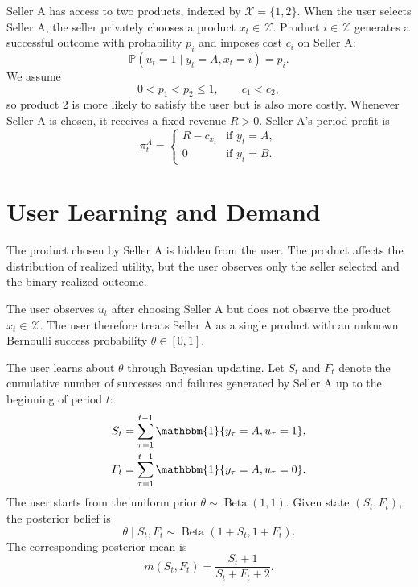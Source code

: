 \documentclass[opre]{informs3}
\newcommand{\Pb}{\mathbb{P}}
\newcommand{\Ind}[1]{\mathbbm{1}\{#1\}}
\newcommand{\Xscr}{\mathcal{X}}
\begin{document}
Seller A has access to two products, indexed by $\Xscr=\{1,2\}$. When the user
selects Seller A, the seller privately chooses a product $x_t\in\Xscr$. Product
$i\in\Xscr$ generates a successful outcome with probability $p_i$ and imposes
cost $c_i$ on Seller A:
\begin{equation}
    \Pb(u_t=1\mid y_t=A,x_t=i)=p_i.
    \label{eq:seller-a-success}
\end{equation}
We assume
\begin{equation}
    0<p_1<p_2\leq 1,\qquad c_1<c_2,
    \label{eq:product-ordering}
\end{equation}
so product 2 is more likely to satisfy the user but is also more costly. Whenever
Seller A is chosen, it receives a fixed revenue $R>0$. Seller A's period profit
is
\begin{equation}
    \pi_t^A=
    \begin{cases}
        R-c_{x_t} & \text{if } y_t=A,\\
        0 & \text{if } y_t=B.
    \end{cases}
    \label{eq:period-profit}
\end{equation}

\section{User Learning and Demand}

The product chosen by Seller A is hidden from the user. The product affects the
distribution of realized utility, but the user observes only the seller selected
and the binary realized outcome.

\begin{assumption}
The user observes $u_t$ after choosing Seller A but does not observe the product
$x_t\in\Xscr$. The user therefore treats Seller A as a single product with an
unknown Bernoulli success probability $\theta\in[0,1]$.
\end{assumption}

The user learns about $\theta$ through Bayesian updating. Let $S_t$ and $F_t$
denote the cumulative number of successes and failures generated by Seller A up
to the beginning of period $t$:
\begin{align}
    S_t &= \sum_{\tau=1}^{t-1}\Ind{y_\tau=A,u_\tau=1},\\
    F_t &= \sum_{\tau=1}^{t-1}\Ind{y_\tau=A,u_\tau=0}.
\end{align}
The user starts from the uniform prior $\theta\sim\operatorname{Beta}(1,1)$.
Given state $(S_t,F_t)$, the posterior belief is
\begin{equation}
    \theta\mid S_t,F_t\sim\operatorname{Beta}(1+S_t,1+F_t).
    \label{eq:posterior}
\end{equation}
The corresponding posterior mean is
\begin{equation}
    m(S_t,F_t)=\frac{S_t+1}{S_t+F_t+2}.
    \label{eq:posterior-mean}
\end{equation}
\end{document}
